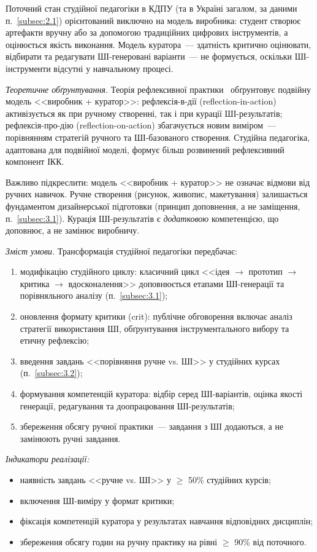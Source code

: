 Поточний стан студійної педагогіки в КДПУ (та в Україні загалом, за даними п.~\ref{subsec:2.1}) орієнтований виключно на модель виробника: студент створює артефакти вручну або за допомогою традиційних цифрових інструментів, а оцінюється якість виконання. Модель куратора~--- здатність критично оцінювати, відбирати та редагувати ШІ-генеровані варіанти~--- не формується, оскільки ШІ-інструменти відсутні у навчальному процесі.

\textit{Теоретичне обґрунтування.} Теорія рефлексивної практики~\cite{Schon1983} обґрунтовує подвійну модель <<виробник + куратор>>: рефлексія-в-дії (reflection-in-action) активізується як при ручному створенні, так і при курації ШІ-результатів; рефлексія-про-дію (reflection-on-action) збагачується новим виміром~--- порівнянням стратегій ручного та ШІ-базованого створення. Студійна педагогіка, адаптована для подвійної моделі, формує більш розвинений рефлексивний компонент ІКК.

Важливо підкреслити: модель <<виробник + куратор>> не означає відмови від ручних навичок. Ручне створення (рисунок, живопис, макетування) залишається фундаментом дизайнерської підготовки (принцип доповнення, а не заміщення, п.~\ref{subsec:3.1}). Курація ШІ-результатів є \textit{додатковою} компетенцією, що доповнює, а не замінює виробничу.

\textit{Зміст умови.} Трансформація студійної педагогіки передбачає:
\begin{enumerate}
    \item модифікацію студійного циклу: класичний цикл <<ідея $\to$ прототип $\to$ критика $\to$ вдосконалення>> доповнюється етапами ШІ-генерації та порівняльного аналізу (п.~\ref{subsec:3.1});
    \item оновлення формату критики (crit): публічне обговорення включає аналіз стратегії використання ШІ, обґрунтування інструментального вибору та етичну рефлексію;
    \item введення завдань <<порівняння ручне vs. ШІ>> у студійних курсах (п.~\ref{subsec:3.2});
    \item формування компетенцій куратора: відбір серед ШІ-варіантів, оцінка якості генерації, редагування та доопрацювання ШІ-результатів;
    \item збереження обсягу ручної практики~--- завдання з ШІ додаються, а не замінюють ручні завдання.
\end{enumerate}

\textit{Індикатори реалізації:}
\begin{itemize}
    \item наявність завдань <<ручне vs. ШІ>> у $\geq$ 50\% студійних курсів;
    \item включення ШІ-виміру у формат критики;
    \item фіксація компетенцій куратора у результатах навчання відповідних дисциплін;
    \item збереження обсягу годин на ручну практику на рівні $\geq$ 90\% від поточного.
\end{itemize}

